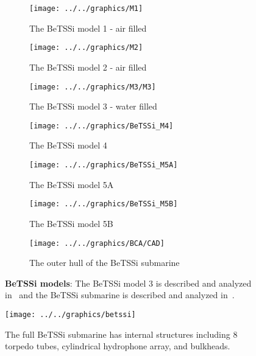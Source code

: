 \begin{figure}
	\centering
	\begin{subfigure}{\textwidth}
		\centering
		\texttt{[image: ../../graphics/M1]} %
		\caption{The BeTSSi model 1 - air filled}
	\end{subfigure}%
	\par\bigskip
	\par\bigskip
	\begin{subfigure}{\textwidth}
		\centering
		\texttt{[image: ../../graphics/M2]} %
		\caption{The BeTSSi model 2 - air filled}
	\end{subfigure}%
	\par\bigskip
	\par\bigskip
	\begin{subfigure}{\textwidth}
		\centering
		\texttt{[image: ../../graphics/M3/M3]} %
		\caption{The BeTSSi model 3 - water filled}
		\label{Fig:BeTSSi_M3}
	\end{subfigure}%
	\par\bigskip
	\par\bigskip
	\begin{subfigure}{0.33\textwidth}
		\centering
		\texttt{[image: ../../graphics/BeTSSi\_M4]} %
		\caption{The BeTSSi model 4}
	\end{subfigure}%
	\hspace*{0.005\textwidth}%
	\begin{subfigure}{0.33\textwidth}
		\centering
		\texttt{[image: ../../graphics/BeTSSi\_M5A]}
		\caption{The BeTSSi model 5A}
	\end{subfigure}%
	\hspace*{0.005\textwidth}%
	\begin{subfigure}{0.33\textwidth}
		\centering
		\texttt{[image: ../../graphics/BeTSSi\_M5B]}
		\caption{The BeTSSi model 5B}
	\end{subfigure}
	\par\bigskip
	\par\bigskip
	\begin{subfigure}{\textwidth}
		\centering
		\texttt{[image: ../../graphics/BCA/CAD]}
		\caption{The outer hull of the BeTSSi submarine}
	\end{subfigure}
	\caption{\textbf{BeTSSi models}: The BeTSSi model 3 is described and analyzed in~\cite{Venas2015iao} and the BeTSSi submarine is described and analyzed in~\cite{Venas2019ibe}.}
	\label{Fig:BeTSSiModels}
\end{figure}
\begin{figure}
	\centering
	\texttt{[image: ../../graphics/betssi]}
	\caption{The full BeTSSi submarine has internal structures including 8 torpedo tubes, cylindrical hydrophone array, and bulkheads.}
	\label{Fig:FullBeTSSi}
\end{figure}


